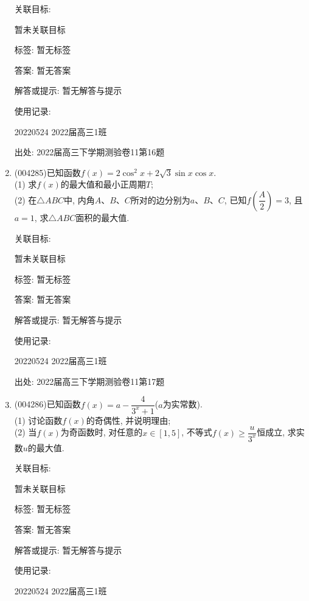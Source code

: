 \documentclass[10pt,a4paper]{article}
\begin{document}
\begin{enumerate}[1.]
关联目标:

暂未关联目标



标签: 暂无标签

答案: 暂无答案

解答或提示: 暂无解答与提示

使用记录:

20220524	2022届高三1班	


出处: 2022届高三下学期测验卷11第16题
\item { (004285)}已知函数$f(x)=2\cos^2 x+2\sqrt{3}\sin x\cos x$.\\
(1) 求$f(x)$的最大值和最小正周期$T$;\\
(2) 在$\triangle ABC$中, 内角$A$、$B$、$C$所对的边分别为$a$、$B$、$C$, 已知$f(\dfrac A2)=3$, 且$a=1$, 求$\triangle ABC$面积的最大值.


关联目标:

暂未关联目标



标签: 暂无标签

答案: 暂无答案

解答或提示: 暂无解答与提示

使用记录:

20220524	2022届高三1班		


出处: 2022届高三下学期测验卷11第17题
\item { (004286)}已知函数$f(x)=a-\dfrac 4{3^x+1}$($a$为实常数).\\
(1) 讨论函数$f(x)$的奇偶性, 并说明理由;\\ 
(2) 当$f(x)$为奇函数时, 对任意的$x\in [1,5]$, 不等式$f(x)\ge \dfrac u{3^x}$恒成立, 求实数$u$的最大值.


关联目标:

暂未关联目标



标签: 暂无标签

答案: 暂无答案

解答或提示: 暂无解答与提示

使用记录:

20220524	2022届高三1班		



\end{enumerate}
\end{document}
